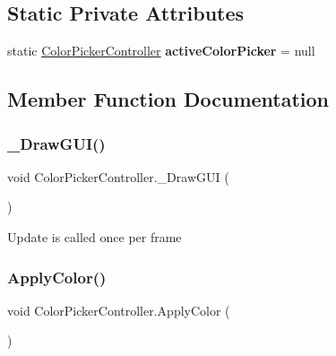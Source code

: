 \subsection*{Static Private Attributes}
\begin{DoxyCompactItemize}
\item 
\mbox{\label{class_color_picker_controller_a8f4a9f8f3ebc69adcb783574991b292a}} 
static \mbox{\hyperlink{class_color_picker_controller}{Color\+Picker\+Controller}} {\bfseries active\+Color\+Picker} = null
\end{DoxyCompactItemize}


\subsection{Member Function Documentation}
\mbox{\label{class_color_picker_controller_a8503e643cd8444bb3d2f8b90a9e6afe3}} 
\subsubsection{\texorpdfstring{\+\_\+\+Draw\+G\+U\+I()}{\_DrawGUI()}}
{\footnotesize\ttfamily void Color\+Picker\+Controller.\+\_\+\+Draw\+G\+UI (\begin{DoxyParamCaption}{ }\end{DoxyParamCaption})}

Update is called once per frame \mbox{\label{class_color_picker_controller_af1be2fecab7ca749e1862a9a61c46401}} 
\subsubsection{\texorpdfstring{Apply\+Color()}{ApplyColor()}}
{\footnotesize\ttfamily void Color\+Picker\+Controller.\+Apply\+Color (\begin{DoxyParamCaption}{ }\end{DoxyParamCaption})\hspace{0.3cm}{\ttfamily [private]}}

